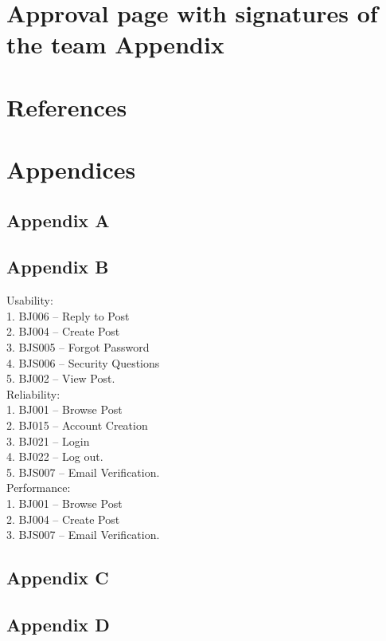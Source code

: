 \documentclass{report}
\begin{document}
\chapter{Approval page with signatures of the team Appendix} 
\chapter{References}
\chapter{Appendices}
\section{Appendix A}
\section{Appendix B}
Usability: \\
1.	BJ006 – Reply to Post\\
2.	BJ004 – Create Post\\
3.	BJS005 – Forgot Password\\
4.	BJS006 – Security Questions\\
5.	BJ002 – View Post.\\
Reliability: \\
1.	BJ001 – Browse Post\\
2.	BJ015 – Account Creation\\
3.	BJ021 – Login\\
4.	BJ022 – Log out.\\
5.	BJS007 – Email Verification.\\
Performance: \\
1.	BJ001 – Browse Post\\
2.	BJ004 – Create Post\\
3.	BJS007 – Email Verification.\\
\section{Appendix C}
\section{Appendix D}
\end{document}
